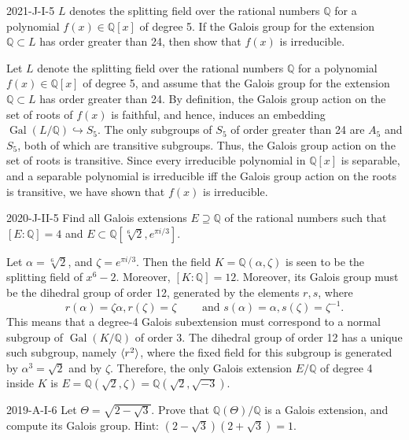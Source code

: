 \documentclass{article}
\newcommand{\embedd}{\hookrightarrow}
\begin{document}
	\begin{prb}{2021-J-I-5}
		$L$ denotes the splitting field over the rational numbers $\mathbb{Q}$ for a polynomial $f(x) \in \mathbb{Q}[x]$ of degree 5. If the Galois group for the extension $\mathbb{Q} \subset L$ has order greater than 24, then show that $f(x)$ is irreducible. 
	\end{prb}
	Let $L$ denote the splitting field over the rational numbers $\mathbb{Q}$ for a polynomial $f(x) \in \mathbb{Q}[x]$ of degree 5, and assume that the Galois group for the extension $\mathbb{Q} \subset L$ has order greater than 24. By definition, the Galois group action on the set of roots of $f(x)$ is faithful, and hence, induces an embedding $\operatorname{Gal}(L/\mathbb{Q}) \embedd S_{5}$. The only subgroups of $S_{5}$ of order greater than 24 are $A_{5}$ and $S_{5}$, both of which are transitive subgroups. Thus, the Galois group action on the set of roots is transitive. Since every irreducible polynomial in $\mathbb{Q}[x]$ is separable, and a separable polynomial is irreducible iff the Galois group action on the roots is transitive, we have shown that $f(x)$ is irreducible.
	
	\begin{prb}{2020-J-II-5}
		Find all Galois extensions $E \supseteq \mathbb{Q}$ of the rational numbers such that $[E: \mathbb{Q}] = 4$ and $E \subset \mathbb{Q}[\sqrt[6]{2}, e^{\pi i/3}]$. 
	\end{prb} 
	Let $\alpha = \sqrt[6]{2}$, and $\zeta = e^{\pi i/3}$. Then the field $K = \mathbb{Q}(\alpha, \zeta)$ is seen to be the splitting field of $x^{6} - 2$. Moreover, $[K: \mathbb{Q}] = 12$. Moreover, its Galois group must be the dihedral group of order 12, generated by the elements $r, s$, where
	\begin{equation*}
		r(\alpha) = \zeta \alpha, r(\zeta) = \zeta \qquad \text{ and } s(\alpha) = \alpha, s(\zeta) = \zeta^{-1}. 
	\end{equation*}
	This means that a degree-4 Galois subextension must correspond to a normal subgroup of $\operatorname{Gal}(K/\mathbb{Q})$ of order 3. The dihedral group of order 12 has a unique such subgroup, namely $\braket{r^{2}}$, where the fixed field for this subgroup is generated by $\alpha^{3} = \sqrt{2}$ and by $\zeta$. Therefore, the only Galois extension $E/\mathbb{Q}$ of degree 4 inside $K$ is $E = \mathbb{Q}(\sqrt{2},\zeta) = \mathbb{Q}(\sqrt{2}, \sqrt{-3})$. 
	
	\begin{prb}{2019-A-I-6}
		Let $\Theta = \sqrt{2-\sqrt{3}}$. Prove that $\mathbb{Q}(\Theta)/\mathbb{Q}$ is a Galois extension, and compute its Galois group. Hint: $(2 - \sqrt{3})(2 + \sqrt{3}) = 1$. 
	\end{prb}
	
\end{document}
